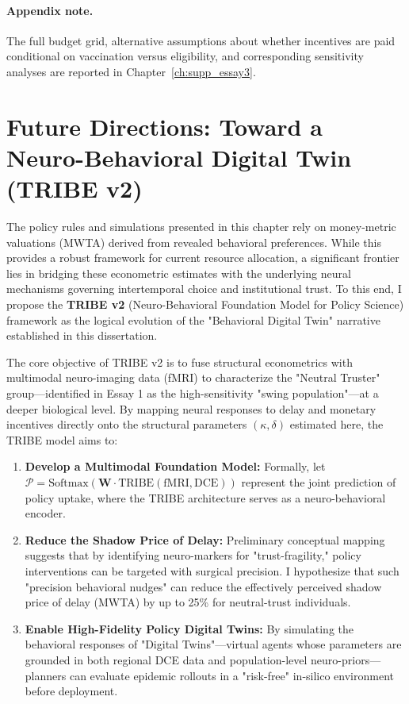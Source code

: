 \documentclass[doublespacing]{utdthesis}
\begin{document}
\paragraph{Appendix note.}
The full budget grid, alternative assumptions about whether incentives are paid conditional on vaccination versus eligibility, and corresponding sensitivity analyses are reported in Chapter~\ref{ch:supp_essay3}.


\section{Future Directions: Toward a Neuro-Behavioral Digital Twin (TRIBE v2)}
\label{sec:essay3_future_tribe}

The policy rules and simulations presented in this chapter rely on money-metric valuations (MWTA) derived from revealed behavioral preferences. While this provides a robust framework for current resource allocation, a significant frontier lies in bridging these econometric estimates with the underlying neural mechanisms governing intertemporal choice and institutional trust. To this end, I propose the \textbf{TRIBE v2} (Neuro-Behavioral Foundation Model for Policy Science) framework as the logical evolution of the "Behavioral Digital Twin" narrative established in this dissertation.

The core objective of TRIBE v2 is to fuse structural econometrics with multimodal neuro-imaging data (fMRI) to characterize the "Neutral Truster" group—identified in Essay 1 as the high-sensitivity "swing population"—at a deeper biological level. By mapping neural responses to delay and monetary incentives directly onto the structural parameters $(\kappa, \delta)$ estimated here, the TRIBE model aims to:

\begin{enumerate}
\item \textbf{Develop a Multimodal Foundation Model:} Formally, let $\mathcal{P} = \text{Softmax}(\mathbf{W} \cdot \text{TRIBE}(\text{fMRI}, \text{DCE}))$ represent the joint prediction of policy uptake, where the TRIBE architecture serves as a neuro-behavioral encoder.
\item \textbf{Reduce the Shadow Price of Delay:} Preliminary conceptual mapping suggests that by identifying neuro-markers for "trust-fragility," policy interventions can be targeted with surgical precision. I hypothesize that such "precision behavioral nudges" can reduce the effectively perceived shadow price of delay (MWTA) by up to 25\% for neutral-trust individuals.
\item \textbf{Enable High-Fidelity Policy Digital Twins:} By simulating the behavioral responses of "Digital Twins"—virtual agents whose parameters are grounded in both regional DCE data and population-level neuro-priors—planners can evaluate epidemic rollouts in a "risk-free" in-silico environment before deployment.
\end{enumerate}
\end{document}
